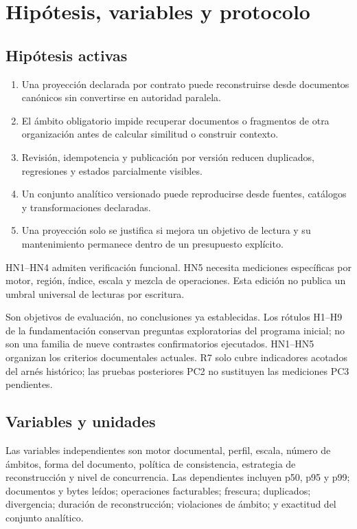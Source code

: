 \chapter{Hipótesis, variables y protocolo}

\section{Hipótesis activas}

\begin{enumerate}[leftmargin=*]
  \item[HN1.] Una proyección declarada por contrato puede reconstruirse desde documentos
  canónicos sin convertirse en autoridad paralela.
  \item[HN2.] El ámbito obligatorio impide recuperar documentos o fragmentos de otra
  organización antes de calcular similitud o construir contexto.
  \item[HN3.] Revisión, idempotencia y publicación por versión reducen duplicados,
  regresiones y estados parcialmente visibles.
  \item[HN4.] Un conjunto analítico versionado puede reproducirse desde fuentes,
  catálogos y transformaciones declaradas.
  \item[HN5.] Una proyección solo se justifica si mejora un objetivo de lectura y su
  mantenimiento permanece dentro de un presupuesto explícito.
\end{enumerate}

HN1--HN4 admiten verificación funcional. HN5 necesita mediciones específicas por motor,
región, índice, escala y mezcla de operaciones. Esta edición no publica un umbral
universal de lecturas por escritura.

Son objetivos de evaluación, no conclusiones ya establecidas. Los rótulos H1--H9 de
la fundamentación conservan preguntas exploratorias del programa inicial; no son
una familia de nueve contrastes confirmatorios ejecutados. HN1--HN5 organizan los
criterios documentales actuales. R7 solo cubre indicadores acotados del arnés histórico;
las pruebas posteriores PC2 no sustituyen las mediciones PC3 pendientes.

\section{Variables y unidades}

Las variables independientes son motor documental, perfil, escala, número de ámbitos,
forma del documento, política de consistencia, estrategia de reconstrucción y nivel de
concurrencia. Las dependientes incluyen p50, p95 y p99; documentos y bytes leídos;
operaciones facturables; frescura; duplicados; divergencia; duración de reconstrucción;
violaciones de ámbito; y exactitud del conjunto analítico.


